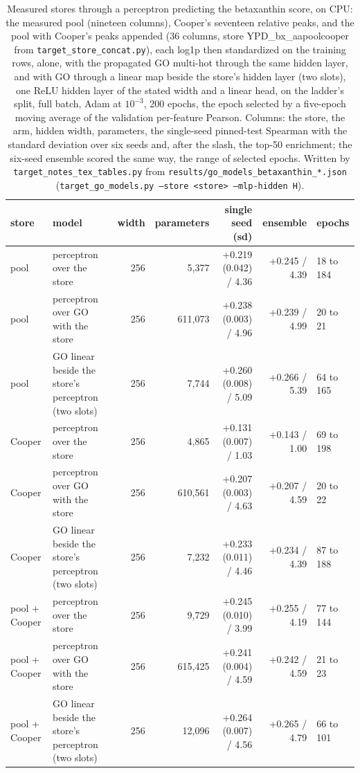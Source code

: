 \begin{table}[H]
  \centering
  \footnotesize
  \setlength{\tabcolsep}{3pt}
  \caption[Cooper's peaks through a perceptron]{Measured stores through a perceptron predicting the betaxanthin score, on CPU: the measured pool (nineteen columns), Cooper's seventeen relative peaks, and the pool with Cooper's peaks appended (36 columns, store YPD\_bx\_aapoolcooper from \texttt{target\_store\_concat.py}), each log1p then standardized on the training rows, alone, with the propagated GO multi-hot through the same hidden layer, and with GO through a linear map beside the store's hidden layer (two slots), one ReLU hidden layer of the stated width and a linear head, on the ladder's split, full batch, Adam at $10^{-3}$, 200 epochs, the epoch selected by a five-epoch moving average of the validation per-feature Pearson. Columns: the store, the arm, hidden width, parameters, the single-seed pinned-test Spearman with the standard deviation over six seeds and, after the slash, the top-50 enrichment; the six-seed ensemble scored the same way, the range of selected epochs. Written by \texttt{target\_notes\_tex\_tables.py} from \texttt{results/go\_models\_betaxanthin\_*.json} (\texttt{target\_go\_models.py --store <store> --mlp-hidden H}).}
  \label{tab:cooper-mlp-betaxanthin}
  \begin{tabular}{@{}llrrrrl@{}}
    \hline
    store & model & width & parameters & single seed (sd) & ensemble & epochs \\
    \hline
    pool & perceptron over the store & 256 & 5,377 & +0.219 (0.042) / 4.36 & +0.245 / 4.39 & 18 to 184 \\
    pool & perceptron over GO with the store & 256 & 611,073 & +0.238 (0.003) / 4.96 & +0.239 / 4.99 & 20 to 21 \\
    pool & GO linear beside the store's perceptron (two slots) & 256 & 7,744 & +0.260 (0.008) / 5.09 & +0.266 / 5.39 & 64 to 165 \\
    Cooper & perceptron over the store & 256 & 4,865 & +0.131 (0.007) / 1.03 & +0.143 / 1.00 & 69 to 198 \\
    Cooper & perceptron over GO with the store & 256 & 610,561 & +0.207 (0.003) / 4.63 & +0.207 / 4.59 & 20 to 22 \\
    Cooper & GO linear beside the store's perceptron (two slots) & 256 & 7,232 & +0.233 (0.011) / 4.46 & +0.234 / 4.39 & 87 to 188 \\
    pool + Cooper & perceptron over the store & 256 & 9,729 & +0.245 (0.010) / 3.99 & +0.255 / 4.19 & 77 to 144 \\
    pool + Cooper & perceptron over GO with the store & 256 & 615,425 & +0.241 (0.004) / 4.59 & +0.242 / 4.59 & 21 to 23 \\
    pool + Cooper & GO linear beside the store's perceptron (two slots) & 256 & 12,096 & +0.264 (0.007) / 4.56 & +0.265 / 4.79 & 66 to 101 \\
    \hline
  \end{tabular}
\end{table}
